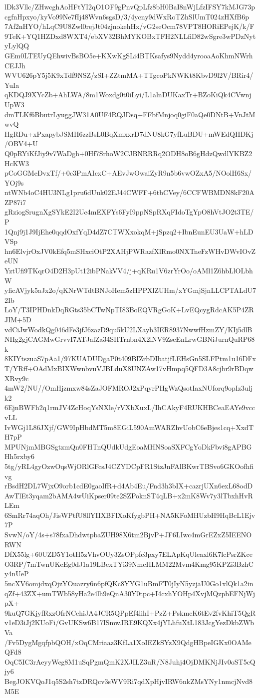 lDk3Vllc/ZHwcghAoHFtYI2qO1OF9gPnvQpLfz8bH0BaI8nWjLfzIFSY7kMJG73p
cgfnHpxyo/kyVo99Ne7fIj48Wvn6sgsD/3/4ycny9dWxRoTZhSlUmT024zHXfB6p
7Af2nHYO/hLqC9U8Zwl0rejJt04zjnokehHx/vG2seOcm78VPT8HORiEPejK/k/F
9TeK+YQ1HZDxd8WXT4/ebXV32BhMYKOBxTFH2NLLfiD82wSgre3wPDzNytyLylQQ
GEm0LTEUyQEhwivBsBO5e+KXwKgSLi4BTKsafys9Nydd4yrooaAoKhmNWrhCEJJh
WVU626pY5j5K9xTdf9NSZ/zSI+ZZtmMA+TTgcoPkNWKt8KbvD9l2V/BRir4/YuIa
qKDQJ9XYcZb+AhLWA/8m1Woxdg0t0iLyi/L1alnDUKaxTr+BZoKiQk4CVwnjUpW3
dmTLKf6BbutrLyuggJW31A0UF4RQJDsq+FFbfMnjoq0giF0aQe0DNtB+VnJtMwvQ
HgRDu+xPxapybJSMH6zzBsL0BqXmxxrD7dNU8kG7yfLuBDU+mWEdQHDKj/OBV4+U
Q0pRYiKfJiy9v7WaDgh+0Hf7SrhoW2CJBNRRRq2ODH8oB6gHdzQwdlYKBZ2HcKW3
pCoGGMeDvxTf/+0c3PmAIcxC+AEvJwOwaiZyR9n5b6vwOZxA5/NOolH6Sx/YOj9s
ntWNb4oC4HU3NLg1pru6dUuk02EJ44CWFF+6tbCVey/6CCFWBMDN8kF20AZP87i7
gRziogSrugnXgSYkE2I2Uc4mEXFYs6FyI9ppNSpRXqFIdoTgYpO8hVtJO2t3TE/P
1Qnj9j1J9IjEhe0qqdOxfYqD4dZ7CTWXxokqM+jSpzq2+IbnEunEU3UaW+hLDVSp
hn6ElvjrOxJV0kEfq5mSHxciOtP2XAHjPWRazfXlRmo0NXTneFzWHvDWvIOvZeUN
YztUfi9TKqrO4D2H3pUt12ibPNakVV4/j+qKRu1V6zrYrOo/oAMl1Z6hbLlOLbhW
yficAVjyk5aJx2o/qKNrWTdtBNJoHem5zHPPXlZUHm/xYGmjSjnLLCPTALdU72Ib
LoY/T3IPHDnkDqRGts35bCTwNpTI83BoEQVRgGoK+LvEQcygRdcAK5P4ZRJIM+5D
vdCiJwWodkQg046dFe3jfJ6zazD9qu5kU2LXayb3IER8937NwwfHzmZY/KIj5dlB
NIIg2gjCAGMwGrvvI7ATJalZa34SHTrnbn4X2lNV9ZseEnLrwGBNiJurnQuRP68k
8KIYtszuaS7pAa1/97KUADUDgaP0t409BIZrbDIbatjfLEHsGn5SLFPtm1u16DFx
T/YRff+OAdMxBIXWwnbvuVJBLduX8UNZAw17vHmpq5QFD3A8cjbr9rBDqwXRvy9c
4mW2/NU//OmHjzmxw84sZaJOFMROJ2xPqyrPHgWzQsotIaxNUforq9opIz3uljk2
6EjnBWFh2q1rmJV4ZcHoqYsNXle/rVXbXuxL/IhCAkyF4RUKHBCeaEAYe9vccvLL
IvWGj1L86JXjf/GW9IpHbdMT5m8EGiL590AmWARZhvUobC6eBjes1cq+XxdTH7pP
MPUNjmMBGSgtzmQn0FHTnQUdkUdgEoaMHNSoaSXFCgYoDkFbvi8gAPBGHh5rxby6
5tg/yRL4gyOzwOqsWjORlGFcsJ4CZYDCpFR1StzJnFAlBKwrTBSvo6GKOofhfivg
rBsdH2DL7WjxO9orb1cdE0gaoIfR+d4Ab4Eu/Fnd3h3bIX+cazrjUXn6exL68odD
AwTlEt3yqam2bAMA4wUiKpser09te2SZPoknST4qLB+x2mK8Wv7y3lTbxhHvRLEm
6SmRr74aqOh/JisWPtfU8llYIIXBFlXoKfygbPH+NA5KFoMHUzbH9HqBcL1Ejv7P
SvwN/oY/4s+s78fxaDhdwtpbaZUH98X6tm2BjvP+JF6LIwc4mGrEZxZ5IEENORWN
DfX55lg+60UZD5Y1otH5zVhvOUy3ZsOPpfc3pxy7ELApKqUleaxl6K7lcPsrZKce
O3RP/7mTwnUKeEg0dJ1a19LBexTYi39NmcHLMM22Mvm4Kmg95KPZi3BzhCy4nUeP
5ncXV6omjdxqOjzYOuazry6n6pfQKc8YYG1uBmFT0jIyN5yzjaU0Go1xlQk1a2in
qZf+43ZX+umTWb58yHa2e4lh9eQnA30Y0tpc+I4cxhYOHp4XvjMQzpbEFNjWjpX+
9kuQ7GKjyfRxzOfrNCehiJA4JCR5QPpEf4lihI+PzZ+PskmcK6tEv2fvKhiT5QgR
v1eD3iJj2KUoFi/GvUKSw6B17ISmwJRE9KQXx4jYLhfuXtL183JcgYezDkbZWbVa
/Fv5DygMgqfpbQOH/xOqCMriaaz3KfLa1XoIEZkSYzX9QdgHBpeIGKx0OAMeQFd8
OqC5IC3rAeyyWcg8M1uSqPgmQmK2XJILZ3uR/N8Juhj4OjDMKNjJIv0oST5cQjy6
BegJOKVQoJ1q5S2sh7tzDRQcv3sWV9Ri7qdXpHjvIRW6nkZMsYNy1nmcjNvd8M5E
